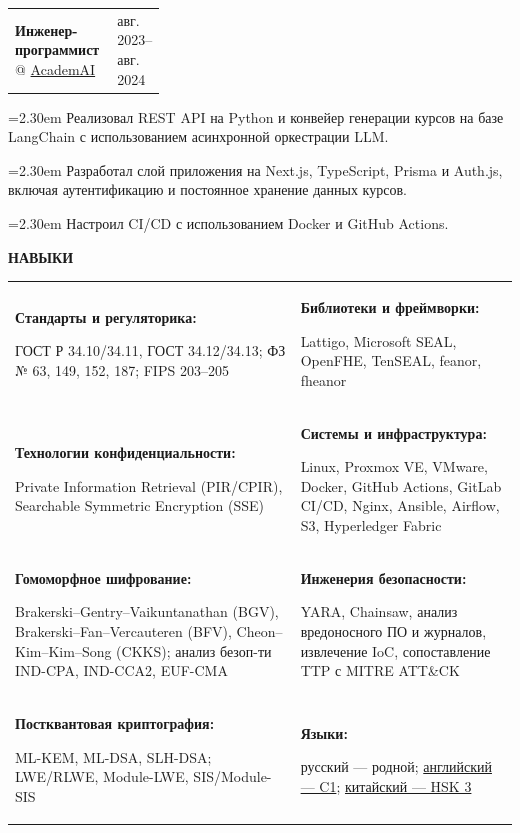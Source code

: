 \documentclass[11pt,a4paper]{article}
\makeatletter
\newcommand{\cvrow}[2]{%
  \noindent
  \begin{minipage}[t]{0.145\textwidth}
    \vspace{0pt}%
    \raggedright
    \fontsize{8.5}{10}\selectfont
    \bfseries\MakeUppercase{#1}
  \end{minipage}%
  \hfill
  \begin{minipage}[t]{0.835\textwidth}
    \vspace{0pt}%
    #2
  \end{minipage}\par
}
\newcommand{\skillcell}[2]{%
  \textbf{#1}\par
  #2
}
\newcommand{\workentry}[2]{%
  \noindent
  \begin{tabularx}{\linewidth}
    {@{}X@{\hspace{0.8em}}
    >{\raggedleft\arraybackslash}p{0.30\linewidth}@{}}
    #1 & \small #2
  \end{tabularx}\par
  \vspace{0.15em}
}
\newcommand{\workproject}[1]{%
  \noindent
  \hangindent=2.30em
  \hangafter=1
  \hspace*{1.15em}\makebox[1.15em][l]{$\diamond$}#1\par
  \vspace{0.12em}
}
\makeatother
\begin{document}
\vspace{0.50em}

\cvrow{}{%
  \workentry
    {\textbf{Инженер-программист} @ \href{https://academai.ru/}{AcademAI}}
    {авг. 2023--авг. 2024}

  \workproject{Реализовал REST API на Python и конвейер генерации курсов на базе LangChain
  с использованием асинхронной оркестрации LLM.}
  \workproject{Разработал слой приложения на Next.js, TypeScript,
  Prisma и Auth.js, включая аутентификацию и постоянное хранение данных курсов.}
  \workproject{Настроил CI/CD с использованием Docker и GitHub Actions.}
}

\vspace{0.75em}

\cvrow{Навыки}{%
  \begin{tabularx}{\linewidth}
    {@{}>{\raggedright\arraybackslash}X
    @{\hspace{1.2em}}
    >{\raggedright\arraybackslash}X@{}}

    \skillcell{Стандарты и регуляторика:}{%
      ГОСТ Р 34.10/34.11, ГОСТ 34.12/34.13;
      ФЗ № 63, 149, 152, 187; FIPS 203--205}
    &
    \skillcell{Библиотеки и фреймворки:}{%
      Lattigo, Microsoft SEAL, OpenFHE, TenSEAL,
      feanor, fheanor}
    \\[0.20em]

    \skillcell{Технологии конфиденциальности:}{%
      Private Information Retrieval (PIR/CPIR),
      Searchable Symmetric Encryption (SSE)}
    &
    \skillcell{Системы и инфраструктура:}{%
      Linux, Proxmox VE, VMware, Docker,
      GitHub Actions, GitLab CI/CD, Nginx, Ansible,
      Airflow, S3,
      Hyperledger Fabric}
    \\[0.20em]

    \skillcell{Гомоморфное шифрование:}{%
      Brakerski--Gentry--Vaikuntanathan (BGV),
      Brakerski--Fan--Vercauteren (BFV),
      Cheon--Kim--Kim--Song (CKKS);
      анализ безоп-ти IND-CPA, IND-CCA2, EUF-CMA}
    &
    \skillcell{Инженерия безопасности:}{%
      YARA, Chainsaw, анализ вредоносного ПО и журналов,
      извлечение IoC, сопоставление TTP с MITRE ATT\&CK}
    \\[0.20em]

    \skillcell{Постквантовая криптография:}{%
      ML-KEM, ML-DSA, SLH-DSA;
      LWE/RLWE, Module-LWE, SIS/Module-SIS}
    &
    \skillcell{Языки:}{%
      русский --- родной;
      \href{https://iasenovets.github.io/files/toefl_8cd5f4a2b8ec8f34da49ea0faeef43f1.pdf}{английский --- C1};
    \href{https://admin.chinesetest.cn/queryScore.do?sid=c2tActR9Wb\%2704b861aefbdc5e9fd0b44afa717d08cbceb0720e582ce25f\%2724d7sWsQ5nVUQSwD}
        {китайский --- HSK 3}}
  \end{tabularx}
}
\end{document}
